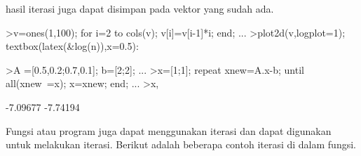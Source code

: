 \documentclass[a4paper,10pt]{article}
\begin{document}
\begin{eulernotebook}
\begin{eulercomment}
\begin{eulercomment}
\begin{eulercomment}
\begin{eulercomment}
\begin{eulercomment}
\begin{eulercomment}
\begin{eulercomment}
\begin{eulercomment}
\begin{eulercomment}
\begin{eulercomment}
\begin{eulercomment}
\begin{eulercomment}
\begin{eulercomment}
\begin{eulercomment}
\begin{eulercomment}
\begin{eulercomment}
\begin{eulercomment}
\begin{eulercomment}
\begin{eulercomment}
\begin{eulercomment}
\begin{eulercomment}
\begin{eulercomment}
\begin{euleroutput}
  [1,  2,  6,  24,  120,  720,  5040,  40320]
\end{euleroutput}
\begin{eulercomment}
hasil iterasi juga dapat disimpan pada vektor yang sudah ada.
\end{eulercomment}
\begin{eulerprompt}
>v=ones(1,100); for i=2 to cols(v); v[i]=v[i-1]*i; end; ...
>plot2d(v,logplot=1); textbox(latex(&log(n)),x=0.5):
\end{eulerprompt}
\begin{eulerprompt}
>A =[0.5,0.2;0.7,0.1]; b=[2;2]; ...
>x=[1;1]; repeat xnew=A.x-b; until all(xnew~=x); x=xnew; end; ...
>x,
\end{eulerprompt}
\begin{euleroutput}
       -7.09677 
       -7.74194 
\end{euleroutput}
\begin{eulercomment}
Fungsi atau program juga dapat menggunakan iterasi dan dapat digunakan untuk melakukan iterasi. Berikut adalah beberapa contoh
iterasi di dalam fungsi.


\end{eulercomment}
\end{eulercomment}
\end{eulercomment}
\end{eulercomment}
\end{eulercomment}
\end{eulercomment}
\end{eulercomment}
\end{eulercomment}
\end{eulercomment}
\end{eulercomment}
\end{eulercomment}
\end{eulercomment}
\end{eulercomment}
\end{eulercomment}
\end{eulercomment}
\end{eulercomment}
\end{eulercomment}
\end{eulercomment}
\end{eulercomment}
\end{eulercomment}
\end{eulercomment}
\end{eulercomment}
\end{eulercomment}
\end{eulernotebook}
\end{document}
